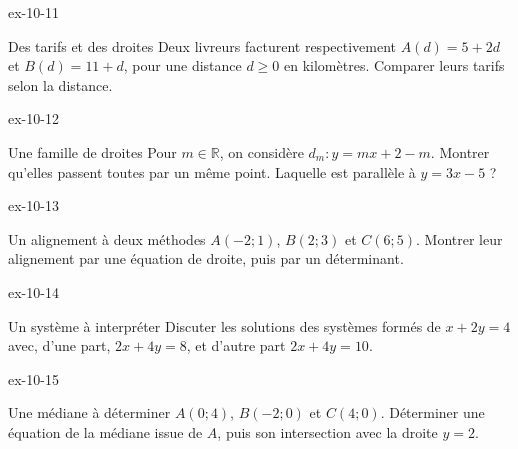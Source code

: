 \clearpage{}
\begin{blocLivre}{ex-10-11}
\begin{exercice}[3]{Des tarifs et des droites}
Deux livreurs facturent respectivement $A(d)=5+2d$ et $B(d)=11+d$, pour une distance $d\ge0$ en kilomètres. Comparer leurs tarifs selon la distance.
\label{fig-ex-10-11}
\end{exercice}
\end{blocLivre}
\begin{blocLivre}{ex-10-12}
\begin{exercice}[3]{Une famille de droites}
Pour $m\in\mathbb R$, on considère $d_m:y=mx+2-m$. Montrer qu’elles passent toutes par un même point. Laquelle est parallèle à $y=3x-5$ ?
\label{fig-ex-10-12}
\end{exercice}
\end{blocLivre}
\begin{blocLivre}{ex-10-13}
\begin{exercice}[3]{Un alignement à deux méthodes}
$A(-2;1)$, $B(2;3)$ et $C(6;5)$. Montrer leur alignement par une équation de droite, puis par un déterminant.
\label{fig-ex-10-13}
\end{exercice}
\end{blocLivre}
\begin{blocLivre}{ex-10-14}
\begin{exercice}[3]{Un système à interpréter}
Discuter les solutions des systèmes formés de $x+2y=4$ avec, d’une part, $2x+4y=8$, et d’autre part $2x+4y=10$.
\label{fig-ex-10-14}
\end{exercice}
\end{blocLivre}
\begin{blocLivre}{ex-10-15}
\begin{exercice}[3]{Une médiane à déterminer}
$A(0;4)$, $B(-2;0)$ et $C(4;0)$. Déterminer une équation de la médiane issue de $A$, puis son intersection avec la droite $y=2$.
\label{fig-ex-10-15}
\end{exercice}
\end{blocLivre}

\clearpage
